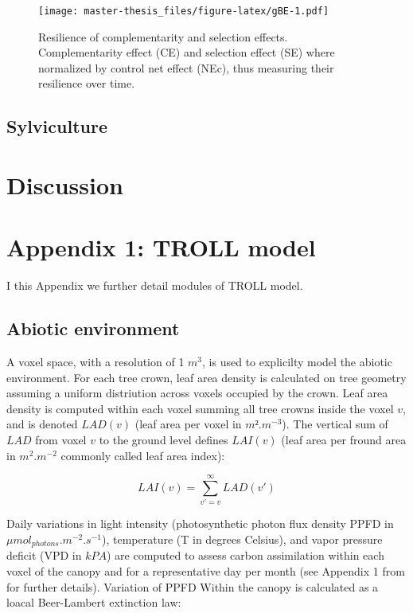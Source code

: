 \documentclass[12pt,]{article}
\let\oldsection\section
\renewcommand\section{\newpage\oldsection}
\theoremstyle{definition}
\theoremstyle{definition}
\theoremstyle{remark}
\begin{document}
\begin{figure}[htbp]
\centering
\texttt{[image: master-thesis\_files/figure-latex/gBE-1.pdf]}
\caption{\label{fig:gBE}Resilience of complementarity and selection effects.
Complementarity effect (CE) and selection effect (SE) where normalized
by control net effect (NEc), thus measuring their resilience over time.}
\end{figure}

\subsection{Sylviculture}\label{sylviculture-1}

\section{Discussion}\label{discussion}

\appendix


\hypertarget{appendix-1-troll-model}{\section{Appendix 1: TROLL
model}\label{appendix-1-troll-model}}

I this Appendix we further detail modules of TROLL model.

\subsection{Abiotic environment}\label{abiotic-environment}

A voxel space, with a resolution of 1 \(m^3\), is used to explicilty
model the abiotic environment. For each tree crown, leaf area density is
calculated on tree geometry assuming a uniform distriution across voxels
occupied by the crown. Leaf area density is computed within each voxel
summing all tree crowns inside the voxel \(v\), and is denoted
\(LAD(v)\) (leaf area per voxel in \(m².m^{-3}\)). The vertical sum of
\(LAD\) from voxel \(v\) to the ground level defines \(LAI(v)\) (leaf
area per fround area in \(m^2.m^{-2}\) commonly called leaf area index):

\begin{equation}
  LAI(v) = \sum _{v'=v} ^\infty LAD(v') 
  \label{eq:LAI}
\end{equation}

Daily variations in light intensity (photosynthetic photon flux density
PPFD in \(\mu mol_{photons}.m^{-2}.s^{-1}\)), temperature (T in degrees
Celsius), and vapor pressure deficit (VPD in \(kPA\)) are computed to
assess carbon assimilation within each voxel of the canopy and for a
representative day per month (see Appendix 1 from \citet{Li} for further
details). Variation of PPFD Within the canopy is calculated as a loacal
Beer-Lambert extinction law:
\end{document}
